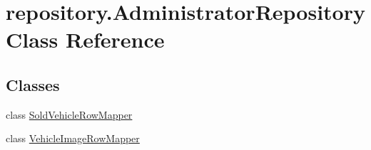 \hypertarget{classrepository_1_1_administrator_repository}{}\section{repository.\+Administrator\+Repository Class Reference}
\label{classrepository_1_1_administrator_repository}
\subsection*{Classes}
\begin{DoxyCompactItemize}
\item 
class \mbox{\hyperlink{classrepository_1_1_administrator_repository_1_1_sold_vehicle_row_mapper}{Sold\+Vehicle\+Row\+Mapper}}
\item 
class \mbox{\hyperlink{classrepository_1_1_administrator_repository_1_1_vehicle_image_row_mapper}{Vehicle\+Image\+Row\+Mapper}}
\end{DoxyCompactItemize}
